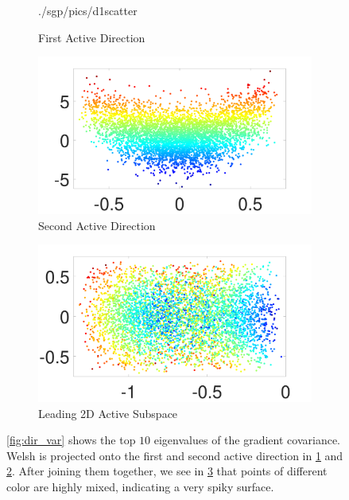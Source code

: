 \begin{figure}[ht]
\begin{center}
\begin{subfigure}{0.47\textwidth}
      {./sgp/pics/d1scatter}
      \caption{First Active Direction}\label{fig:d1_sca}
    \end{subfigure}
    \begin{subfigure}{0.47\textwidth}
      \centering
      \captionsetup{justification=centering}
      \includegraphics[width=\textwidth,trim=1cm .5cm 2.5cm 1.5cm,clip]
      {./sgp/pics/d2scatter}
      \caption{Second Active Direction}\label{fig:d2_sca}
    \end{subfigure}
    \begin{subfigure}{0.47\textwidth}
      \centering
      \captionsetup{justification=centering}
      \includegraphics[width=\textwidth,trim=1cm .5cm 2.5cm 1.5cm,clip]
      {./sgp/pics/jointscatter}
      \caption{Leading 2D Active Subspace}\label{fig:joint_sca}
    \end{subfigure}
    \caption{\cref{fig:dir_var} shows the top $10$ eigenvalues of the gradient
    covariance. Welsh is projected onto the first and second active direction in
    \ref{fig:d1_sca} and \ref{fig:d2_sca}. After joining them together, we see
    in \ref{fig:joint_sca} that points of different color are highly mixed, indicating a very spiky surface.} \label{fig:dim_red}
  \end{center}
\end{figure}

